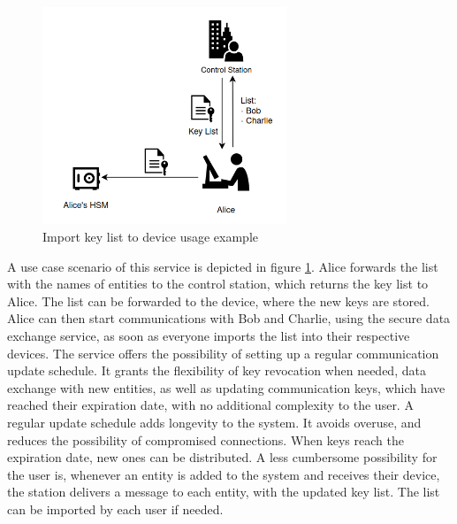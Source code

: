 \begin{figure}[h]
    \centering
    \includegraphics[width=0.65\textwidth]{./Images/user-import-service.png}
    \caption{Import key list to device usage example}
    \label{fig:user:import-service}
\end{figure}

A use case scenario of this service is depicted in figure \ref{fig:user:import-service}.
Alice forwards the list with the names of entities to the control station, which returns the key list to Alice. The list can be forwarded to the device, where the new keys are stored.
Alice can then start communications with Bob and Charlie, using the secure data exchange service, as soon as everyone imports the list into their respective devices.
The service offers the possibility of setting up a regular communication update schedule. It grants the flexibility of key revocation when needed, data exchange with new entities, as well as updating communication keys, which have reached their expiration date, with no additional complexity to the user.
A regular update schedule adds longevity to the system. It avoids overuse, and reduces the possibility of compromised connections. When keys reach the expiration date, new ones can be distributed.
A less cumbersome possibility for the user is, whenever an entity is added to the system and receives their device, the station delivers a message to each entity, with the updated key list. The list can be imported by each user if needed.


